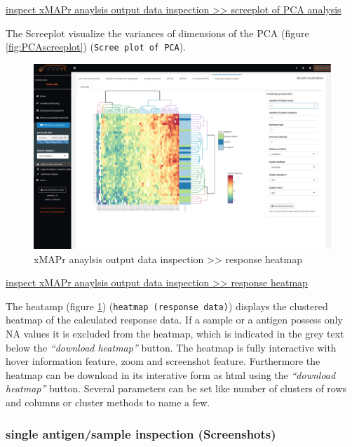 \documentclass[]{book}
\theoremstyle{definition}
\theoremstyle{definition}
\theoremstyle{definition}
\theoremstyle{remark}
\begin{document}
\href{figures/global_result_overview_PCA_scree.png}{inspect xMAPr
anaylsis output data inspection \textgreater{}\textgreater{} screeplot
of PCA analysis}

The Screeplot visualize the variances of dimensions of the PCA (figure
\ref{fig:PCAscreeplot}) (\texttt{Scree\ plot\ of\ PCA}).

\begin{figure}
\includegraphics[width=50.47in]{figures/response_heatmap} \caption{xMAPr anaylsis output data inspection >> response heatmap}\label{fig:responseHeatmap}
\end{figure}

\href{figures/response_heatmap.png}{inspect xMAPr anaylsis output data
inspection \textgreater{}\textgreater{} response heatmap}

The heatamp (figure \ref{fig:responseHeatmap})
(\texttt{heatmap\ (response\ data)}) displays the clustered heatmap of
the calculated response data. If a sample or a antigen possess only NA
values it is excluded from the heatmap, which is indicated in the grey
text below the \emph{``download heatmap''} button. The heatmap is fully
interactive with hover information feature, zoom and screenshot feature.
Furthermore the heatmap can be download in its interative form as html
using the \emph{``download heatmap''} button. Several parameters can be
set like number of clusters of rows and columns or cluster methods to
name a few.

\subsubsection{single antigen/sample inspection
(Screenshots)}\label{single-antigensample-inspection-screenshots}
\end{document}
